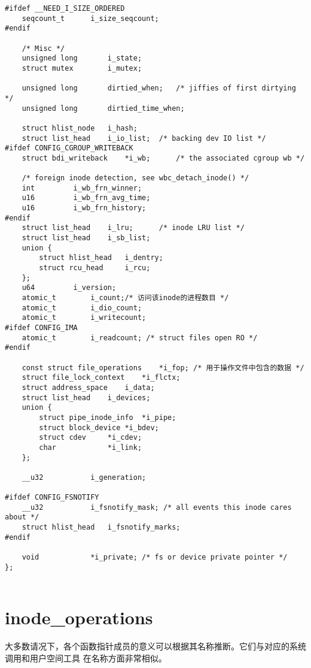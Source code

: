 \begin{lstlisting}
#ifdef __NEED_I_SIZE_ORDERED
	seqcount_t		i_size_seqcount;
#endif

	/* Misc */
	unsigned long		i_state;
	struct mutex		i_mutex;

	unsigned long		dirtied_when;	/* jiffies of first dirtying */
	unsigned long		dirtied_time_when;

	struct hlist_node	i_hash;
	struct list_head	i_io_list;	/* backing dev IO list */
#ifdef CONFIG_CGROUP_WRITEBACK
	struct bdi_writeback	*i_wb;		/* the associated cgroup wb */

	/* foreign inode detection, see wbc_detach_inode() */
	int			i_wb_frn_winner;
	u16			i_wb_frn_avg_time;
	u16			i_wb_frn_history;
#endif
	struct list_head	i_lru;		/* inode LRU list */
	struct list_head	i_sb_list;
	union {
		struct hlist_head	i_dentry;
		struct rcu_head		i_rcu;
	};
	u64			i_version;
	atomic_t		i_count;/* 访问该inode的进程数目 */
	atomic_t		i_dio_count;
	atomic_t		i_writecount;
#ifdef CONFIG_IMA
	atomic_t		i_readcount; /* struct files open RO */
#endif

	const struct file_operations	*i_fop;	/* 用于操作文件中包含的数据 */
	struct file_lock_context	*i_flctx;
	struct address_space	i_data;
	struct list_head	i_devices;
	union {
		struct pipe_inode_info	*i_pipe;
		struct block_device	*i_bdev;
		struct cdev		*i_cdev;
		char			*i_link;
	};

	__u32			i_generation;

#ifdef CONFIG_FSNOTIFY
	__u32			i_fsnotify_mask; /* all events this inode cares about */
	struct hlist_head	i_fsnotify_marks;
#endif

	void			*i_private; /* fs or device private pointer */
};


\end{lstlisting}


\section{inode\_operations}

大多数请况下，各个函数指针成员的意义可以根据其名称推断。它们与对应的系统调用和用户空间工具
在名称方面非常相似。

